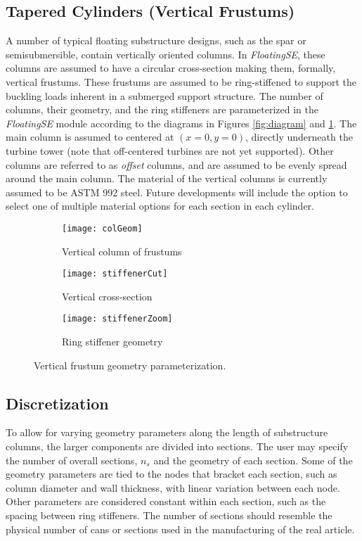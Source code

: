 \subsection{Tapered Cylinders (Vertical Frustums)}
A number of typical floating substructure designs, such as the spar or
semisubmersible, contain vertically oriented columns.  In
\textit{FloatingSE}, these columns are
assumed to have a circular cross-section making them, formally, vertical
frustums.  These frustums are assumed to be ring-stiffened to support
the buckling loads inherent in a submerged support structure.  The
number of columns, their geometry, and the ring stiffeners are
parameterized in the \textit{FloatingSE} module according to the
diagrams in Figures \ref{fig:diagram} and \ref{fig:column}.  The main
column is assumed to centered at $(x=0, y=0)$, directly underneath the
turbine tower (note that off-centered turbines are not yet supported).
Other columns are referred to as \textit{offset} columns, and are
assumed to be evenly spread around the main column.  The material of the
vertical columns is currently assumed to be ASTM 992 steel.
Future developments will include the option to select one of multiple
material options for each section in each cylinder.

\begin{figure}[htb]
  \begin{subfigure}[b]{0.38\linewidth}
    \centering \texttt{[image: colGeom]}
    \caption{Vertical column of frustums}
  \end{subfigure}
  \begin{subfigure}[b]{0.29\linewidth}
    \centering \texttt{[image: stiffenerCut]}
    \caption{Vertical cross-section}
  \end{subfigure}
  \begin{subfigure}[b]{0.29\linewidth}
    \centering \texttt{[image: stiffenerZoom]}
    \caption{Ring stiffener geometry}
  \end{subfigure}
  \caption{Vertical frustum geometry parameterization.}
  \label{fig:column}
\end{figure}

\subsection{Discretization}
To allow for varying geometry parameters along the length of
substructure columns, the larger components are divided into sections.
The user may specify the number of overall sections, $n_s$ and the
geometry of each section.  Some of the geometry parameters are tied to
the nodes that bracket each section, such as column diameter and wall
thickness, with linear variation between each node.  Other parameters
are considered constant within each section, such as the spacing between
ring stiffeners.  The number of sections should resemble the physical
number of cans or sections used in the manufacturing of the real
article.

